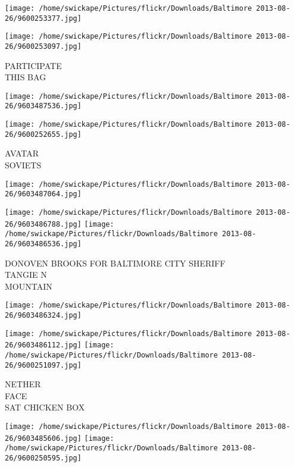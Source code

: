 \documentclass[10pt,letterpaper]{article}
\begin{document}
\texttt{[image: /home/swickape/Pictures/flickr/Downloads/Baltimore 2013-08-26/9600253377.jpg]}

\vspace{0.25in}
\texttt{[image: /home/swickape/Pictures/flickr/Downloads/Baltimore 2013-08-26/9600253097.jpg]}

PARTICIPATE\\
THIS BAG\\
\pagebreak

\texttt{[image: /home/swickape/Pictures/flickr/Downloads/Baltimore 2013-08-26/9603487536.jpg]}

\vspace{0.25in}
\texttt{[image: /home/swickape/Pictures/flickr/Downloads/Baltimore 2013-08-26/9600252655.jpg]}

AVATAR\\
SOVIETS\\
\pagebreak

\texttt{[image: /home/swickape/Pictures/flickr/Downloads/Baltimore 2013-08-26/9603487064.jpg]}

\vspace{0.25in}
\texttt{[image: /home/swickape/Pictures/flickr/Downloads/Baltimore 2013-08-26/9603486788.jpg]}
\texttt{[image: /home/swickape/Pictures/flickr/Downloads/Baltimore 2013-08-26/9603486536.jpg]}

DONOVEN BROOKS FOR BALTIMORE CITY SHERIFF\\
TANGIE N\\
MOUNTAIN\\
\pagebreak

\texttt{[image: /home/swickape/Pictures/flickr/Downloads/Baltimore 2013-08-26/9603486324.jpg]}

\vspace{0.25in}
\texttt{[image: /home/swickape/Pictures/flickr/Downloads/Baltimore 2013-08-26/9603486112.jpg]}
\texttt{[image: /home/swickape/Pictures/flickr/Downloads/Baltimore 2013-08-26/9600251097.jpg]}

NETHER\\
FACE\\
SAT CHICKEN BOX\\
\pagebreak

\texttt{[image: /home/swickape/Pictures/flickr/Downloads/Baltimore 2013-08-26/9603485606.jpg]}
\texttt{[image: /home/swickape/Pictures/flickr/Downloads/Baltimore 2013-08-26/9600250595.jpg]}
\end{document}

